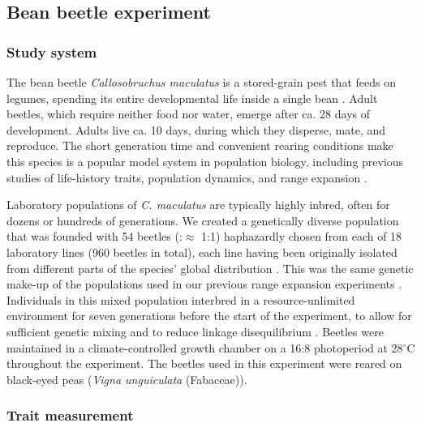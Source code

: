 \documentclass[11pt]{article}
\begin{document}
\subsection*{Bean beetle experiment}

\subsubsection*{Study system}

The bean beetle \textit{Callosobruchus maculatus} is a stored-grain pest that feeds on legumes, spending its entire developmental life inside a single bean \citep{fujii_behavioral_1990}.
Adult beetles, which require neither food nor water, emerge after ca. 28 days of development.
Adults live ca. 10 days, during which they disperse, mate, and reproduce.
The short generation time and convenient rearing conditions make this species is a popular model system in population biology, including previous studies of life-history traits, population dynamics, and range expansion \citep{bellows_analytical_1982,fujii_behavioral_1990,miller_confronting_2011,miller_sex_2013,wagner_genetic_2016,ochocki_rapid_2017}.

Laboratory populations of \textit{C. maculatus} are typically highly inbred, often for dozens or hundreds of generations.
We created a genetically diverse population that was founded with 54 beetles (\female:\mars $\approx$ 1:1) haphazardly chosen from each of 18 laboratory lines (960 beetles in total), each line having been originally isolated from different parts of the species’ global distribution \citep{downey_comparative_2015}.
This was the same genetic make-up of the populations used in our previous range expansion experiments \citep{ochocki_rapid_2017}.
Individuals in this mixed population interbred in a resource-unlimited environment for seven generations before the start of the experiment, to allow for sufficient genetic mixing and to reduce linkage disequilibrium \citep{roughgarden_theory_1979,ochocki_rapid_2017}.
Beetles were maintained in a climate-controlled growth chamber on a 16:8 photoperiod at 28$^{\circ}$C throughout the experiment.
The beetles used in this experiment were reared on black-eyed peas (\textit{Vigna unguiculata} (Fabaceae)). %

\subsubsection*{Trait measurement}
\end{document}
